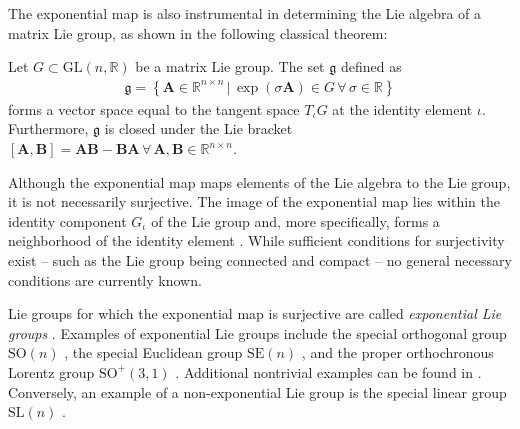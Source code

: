 The exponential map is also instrumental in determining the Lie algebra of a matrix Lie group, as shown in the following classical theorem:
\begin{theorem}
    Let $G\subset\text{GL}(n, \mathbb{R})$ be a matrix Lie group. The set $\mathfrak{g}$ defined as
    \begin{align}
        \mathfrak{g} = \left\{\mathbf{A}\in\mathbb{R}^{n\times n} \,|\, \exp(\sigma\mathbf{A})\in G\,\forall\,\sigma\in\mathbb{R}\right\}
    \end{align}
    forms a vector space equal to the tangent space $T_\iota G$ at the identity element $\iota$. Furthermore, $\mathfrak{g}$ is closed under the Lie bracket $[\mathbf{A}, \mathbf{B}] = \mathbf{A}\mathbf{B} - \mathbf{B}\mathbf{A}\,\forall\,\mathbf{A},\mathbf{B}\in\mathbb{R}^{n\times n}$.\hfill\qedsymbol
\end{theorem}

Although the exponential map maps elements of the Lie algebra to the Lie group, it is not necessarily surjective. The image of the exponential map lies within the identity component $G_\iota$ of the Lie group and, more specifically, forms a neighborhood of the identity element \citep[p. 56]{Hall2015}. While sufficient conditions for surjectivity exist -- such as the Lie group being connected and compact \citep[p. 316]{Hall2015} -- no general necessary conditions are currently known.

Lie groups for which the exponential map is surjective are called \emph{exponential Lie groups} \citep{djokovic1995exponential}. Examples of exponential Lie groups include the special orthogonal group $\text{SO}(n)$ \citep[p. 28]{Gallier2020}, the special Euclidean  group $\text{SE}(n)$ \citep[p. 42]{Gallier2020}, and the proper orthochronous Lorentz group $\text{SO}^+(3,1)$ \citep[p. 197]{Gallier2020}. Additional nontrivial examples can be found in \citet{djokovic1995exponential}. Conversely, an example of a non-exponential Lie group is the special linear group $\text{SL}(n)$ \citep[p. 28]{Gallier2020}.
